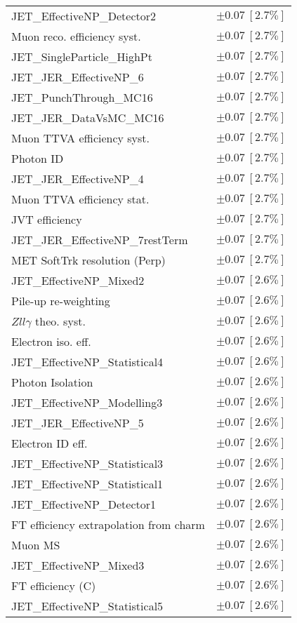 \begin{tabular}{lr}
JET\_EffectiveNP\_Detector2 & $\pm 0.07\ [2.7\%]$ \\
Muon reco. efficiency syst. & $\pm 0.07\ [2.7\%]$ \\
JET\_SingleParticle\_HighPt & $\pm 0.07\ [2.7\%]$ \\
JET\_JER\_EffectiveNP\_6 & $\pm 0.07\ [2.7\%]$ \\
JET\_PunchThrough\_MC16 & $\pm 0.07\ [2.7\%]$ \\
JET\_JER\_DataVsMC\_MC16 & $\pm 0.07\ [2.7\%]$ \\
Muon TTVA efficiency syst. & $\pm 0.07\ [2.7\%]$ \\
Photon ID & $\pm 0.07\ [2.7\%]$ \\
JET\_JER\_EffectiveNP\_4 & $\pm 0.07\ [2.7\%]$ \\
Muon TTVA efficiency stat. & $\pm 0.07\ [2.7\%]$ \\
JVT efficiency & $\pm 0.07\ [2.7\%]$ \\
JET\_JER\_EffectiveNP\_7restTerm & $\pm 0.07\ [2.7\%]$ \\
MET SoftTrk resolution (Perp) & $\pm 0.07\ [2.7\%]$ \\
JET\_EffectiveNP\_Mixed2 & $\pm 0.07\ [2.6\%]$ \\
Pile-up re-weighting & $\pm 0.07\ [2.6\%]$ \\
$Zll\gamma$ theo. syst. & $\pm 0.07\ [2.6\%]$ \\
Electron iso. eff. & $\pm 0.07\ [2.6\%]$ \\
JET\_EffectiveNP\_Statistical4 & $\pm 0.07\ [2.6\%]$ \\
Photon Isolation & $\pm 0.07\ [2.6\%]$ \\
JET\_EffectiveNP\_Modelling3 & $\pm 0.07\ [2.6\%]$ \\
JET\_JER\_EffectiveNP\_5 & $\pm 0.07\ [2.6\%]$ \\
Electron ID eff. & $\pm 0.07\ [2.6\%]$ \\
JET\_EffectiveNP\_Statistical3 & $\pm 0.07\ [2.6\%]$ \\
JET\_EffectiveNP\_Statistical1 & $\pm 0.07\ [2.6\%]$ \\
JET\_EffectiveNP\_Detector1 & $\pm 0.07\ [2.6\%]$ \\
FT efficiency extrapolation from charm & $\pm 0.07\ [2.6\%]$ \\
Muon MS & $\pm 0.07\ [2.6\%]$ \\
JET\_EffectiveNP\_Mixed3 & $\pm 0.07\ [2.6\%]$ \\
FT efficiency (C) & $\pm 0.07\ [2.6\%]$ \\
JET\_EffectiveNP\_Statistical5 & $\pm 0.07\ [2.6\%]$ \\

\end{tabular}
